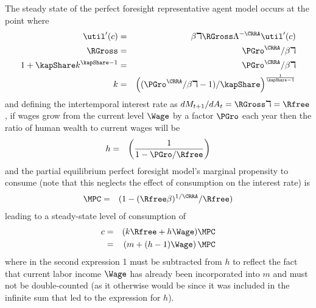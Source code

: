 
The steady state of the perfect foresight representative agent model occurs at the point
where
\begin{eqnarray}
  \util^{\prime}(c) & = & \beta \daleth \RGross  \Lambda^{-\CRRA} \util^{\prime}(c)
\\ \RGross  & = & \PGro^{\CRRA}/\beta \daleth
\\ 1+\kapShare k^{\kapShare-1} & = & \PGro^{\CRRA}/\beta \daleth
\\ k & = & \left((\PGro^{\CRRA}/\beta \daleth -1)/\kapShare\right)^{\frac{1}{\kapShare-1}}
\end{eqnarray}
and defining the intertemporal interest rate as $d M_{t+1}/d A_{t} = \RGross \daleth = \Rfree$,
if wages grow from the current level $\Wage$ by a factor $\PGro$
each year then the ratio of human wealth to current wages will be
\begin{eqnarray}
  h & = & \left(\frac{1}{1-\PGro/\Rfree}\right)
\end{eqnarray}
and the partial equilibrium perfect foresight model's marginal propensity to consume
(note that this neglects the effect of consumption on the interest rate) is
\begin{eqnarray}
  \MPC & = & (1-(\Rfree\beta)^{1/\CRRA}/\Rfree)
\end{eqnarray}
leading to a steady-state level of consumption of
\begin{eqnarray}
  c & = & (k\Rfree +h \Wage)\MPC
\\ & = & \left(m+(h-1)\Wage\right)\MPC
\end{eqnarray}
where in the second expression 1 must be subtracted from $h$ to
reflect the fact that current labor income $\Wage$ has
already been incorporated into $m$ and must not be double-counted
(as it otherwise would be since it was included in the infinite
sum that led to the expression for $h$).

%

